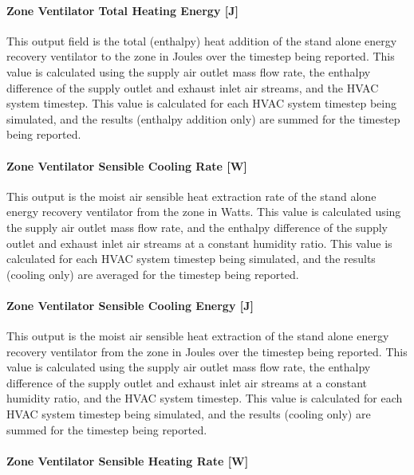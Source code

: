 \paragraph{Zone Ventilator Total Heating Energy {[}J{]}}\label{zone-ventilator-total-heating-energy-j}

This output field is the total (enthalpy) heat addition of the stand alone energy recovery ventilator to the zone in Joules over the timestep being reported. This value is calculated using the supply air outlet mass flow rate, the enthalpy difference of the supply outlet and exhaust inlet air streams, and the HVAC system timestep. This value is calculated for each HVAC system timestep being simulated, and the results (enthalpy addition only) are summed for the timestep being reported.

\paragraph{Zone Ventilator Sensible Cooling Rate {[}W{]}}\label{zone-ventilator-sensible-cooling-rate-w}

This output is the moist air sensible heat extraction rate of the stand alone energy recovery ventilator from the zone in Watts. This value is calculated using the supply air outlet mass flow rate, and the enthalpy difference of the supply outlet and exhaust inlet air streams at a constant humidity ratio. This value is calculated for each HVAC system timestep being simulated, and the results (cooling only) are averaged for the timestep being reported.

\paragraph{Zone Ventilator Sensible Cooling Energy {[}J{]}}\label{zone-ventilator-sensible-cooling-energy-j}

This output is the moist air sensible heat extraction of the stand alone energy recovery ventilator from the zone in Joules over the timestep being reported. This value is calculated using the supply air outlet mass flow rate, the enthalpy difference of the supply outlet and exhaust inlet air streams at a constant humidity ratio, and the HVAC system timestep. This value is calculated for each HVAC system timestep being simulated, and the results (cooling only) are summed for the timestep being reported.

\paragraph{Zone Ventilator Sensible Heating Rate {[}W{]}}\label{zone-ventilator-sensible-heating-rate-w}

